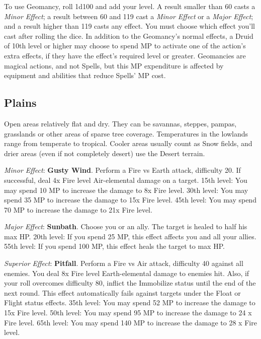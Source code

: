 To use Geomancy, roll 1d100 and add your level. A result smaller than 60 casts a \textit{Minor Effect}; a result between 60 and 119 cast a \textit{Minor Effect} or a \textit{Major Effect}; and a result higher than 119 casts any effect.  You must choose which effect you'll cast after rolling the dice. In addition to the Geomancy’s normal  effects, a Druid of 10th level or higher may choose to spend MP to activate one of the action’s extra effects,  if they have the effect’s required level or greater. Geomancies are magical actions, and not Spells, but this  MP expenditure is affected by equipment and abilities that reduce Spells’ MP cost.

\begin{multicols}{2}
\subsection*{Plains}\label{subsec:geo-plains}
	
Open areas relatively flat and dry. They can be savannas, steppes, pampas, grasslands or other areas of sparse tree coverage. Temperatures in the  lowlands range from temperate to tropical. Cooler  areas usually count as Snow fields, and drier areas  (even if not completely desert) use the Desert  terrain.

\textit{Minor Effect}: \textbf{Gusty Wind}. Perform a Fire vs Earth attack, difficulty 20. If successful, deal 4x Fire level Air-elemental damage on a target. 15th level: You may spend 10 MP to increase the damage to 8x Fire level. 30th level: You may spend 35 MP to increase the damage to 15x Fire level. 45th level: You may spend 70 MP to increase the damage to 21x Fire level.

\textit{Major Effect}: \textbf{Sunbath}. Choose you or an ally. The target is healed to half his max HP\@. 20th level: If you spend 25 MP, this effect affects you and all your allies. 55th level: If you spend 100 MP, this effect heals the target to max HP\@. %

\textit{Superior Effect}: \textbf{Pitfall}. Perform a Fire vs Air attack, difficulty 40 against all enemies. You deal 8x Fire level Earth-elemental damage to enemies hit. Also, if your roll overcomes difficulty 80, inflict the Immobilize status until the end of the next round. This effect automatically fails against targets under the Float or Flight status effects. 35th level: You may spend 52 MP to increase the damage to 15x Fire level. 50th level: You may spend 95 MP to increase the damage to 24 x Fire level. 65th level: You may spend 140 MP to increase the damage to 28 x Fire level.


\end{multicols}
